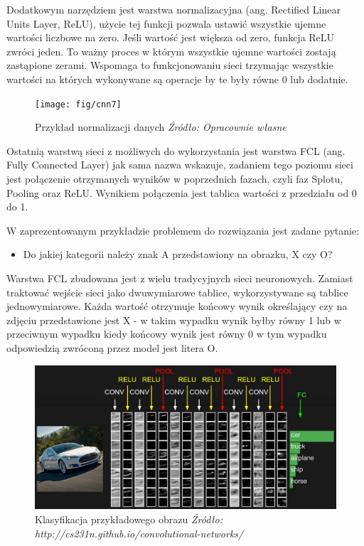 \documentclass[brudnopis]{xmgr}
\begin{document}
Dodatkowym narzędziem jest warstwa normalizacyjna (ang. Rectified Linear Units Layer, ReLU), użycie tej funkcji pozwala ustawić wszystkie ujemne wartości liczbowe na zero. Jeśli wartość jest większa od zero, funkcja ReLU zwróci jeden. To ważny proces w którym wszystkie ujemne wartości zostają zastąpione zerami. Wspomaga to funkcjonowaniu sieci trzymając wszystkie wartości na których wykonywane są operacje by te były równe 0 lub dodatnie.

\begin{figure}[!tbh]
\centering
\texttt{[image: fig/cnn7]}
\caption{Przykład normalizacji danych \emph{Źródło: Opracownie własne}}
\end{figure}

Ostatnią warstwą sieci z możliwych do wykorzystania jest warstwa FCL (ang. Fully Connected Layer) jak sama nazwa wskazuje, zadaniem tego poziomu sieci jest połączenie otrzymanych wyników w poprzednich fazach, czyli faz Splotu, Pooling oraz ReLU. Wynikiem połączenia jest tablica wartości z przedziału od 0 do 1. 
\newpage

W zaprezentowanym przykładzie problemem do rozwiązania jest zadane pytanie:

\begin{itemize}
\item
Do jakiej kategorii należy znak A przedstawiony na obrazku, X czy O?
\end{itemize}

Warstwa FCL zbudowana jest z wielu tradycyjnych sieci neuronowych. Zamiast traktować wejście sieci jako dwuwymiarowe tablice, wykorzystywane są tablice jednowymiarowe. Każda wartość otrzymuje końcowy wynik określający czy na zdjęciu przedstawione jest X - w takim wypadku wynik byłby równy 1 lub w przeciwnym wypadku kiedy końcowy wynik jest równy 0 w tym wypadku odpowiedzią zwróconą przez model jest litera O.

\begin{figure}[!tbh]
\centering
\includegraphics[width=.8\hsize]{fig/convnet}
\caption{Klasyfikacja przykładowego obrazu \emph{Źródło: http://cs231n.github.io/convolutional-networks/}}
\end{figure}
\end{document}
